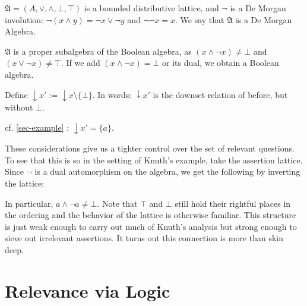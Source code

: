 \documentclass[11pt,a4paper]{article}
\theoremstyle{definition}
\begin{document}
 $\mathfrak{A} = (A, \lor, \land, \bot, \top)$ is a bounded distributive lattice, and
$\neg$ is a De Morgan involution: $\neg(x \land y) = \neg 
x \lor \neg y$ and $\neg\neg x = x$. We say that $\mathfrak{A}$ is a De Morgan Algebra.

\note $\mathfrak{A}$ is a proper subalgebra of the Boolean algebra, as $(x \land \neg x) \neq \bot$ and $(x \lor \neg x) \neq \top$. If we add $(x \land \neg x) = \bot$ or its dual, we obtain a Boolean algebra. 

 Define $\downarrow x\prime := \downarrow x \setminus \{\bot\}$. In words: $\downarrow x\prime$ is the downset relation of before, but without $\bot$. 

\example cf. \ref{sec-example} : $\downarrow x\prime = \{a\}$.

\remark These considerations give us a tighter control over the set of relevant questions. To see that this is so in the setting of Knuth's example, take the assertion lattice. Since $\neg$ is a dual automorphism on the algebra, we get the following by inverting the lattice:


In particular, $a \land \neg a \neq \bot$.%
\remark Note that $\top$ and $\bot$ still hold their rightful places in the ordering and the behavior of the lattice is otherwise familiar. This structure is just weak enough to carry out much of Knuth's analysis but strong enough to sieve out irrelevant assertions. It turns out this connection is more than skin deep.
\section{Relevance via Logic}
\end{document}
